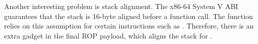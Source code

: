
Another interesting problem is stack alignment. The x86-64 System V ABI\cite{systemv} guarantees that the stack is 16-byte aligned before a function call. The  function relies on this assumption for certain instructions such as . Therefore, there is an extra  gadget in the final ROP payload, which aligns the stack for .






